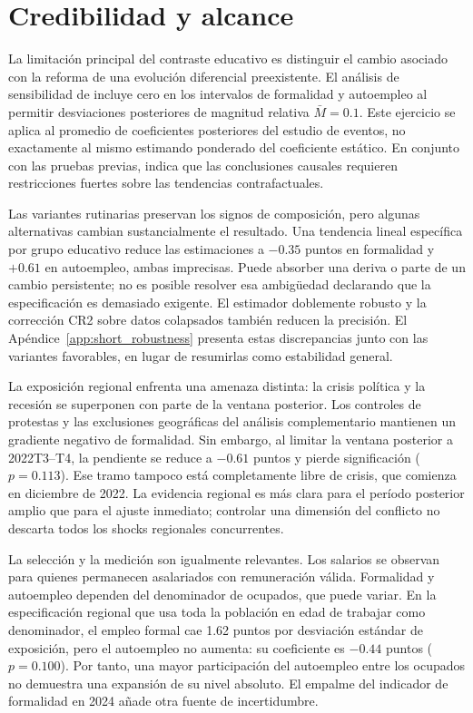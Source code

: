 \section{Credibilidad y alcance}

La limitación principal del contraste educativo es distinguir el cambio asociado con la reforma de una evolución diferencial preexistente. El análisis de sensibilidad de \citet{rambachan_roth_2023} incluye cero en los intervalos de formalidad y autoempleo al permitir desviaciones posteriores de magnitud relativa $\bar M=0.1$. Este ejercicio se aplica al promedio de coeficientes posteriores del estudio de eventos, no exactamente al mismo estimando ponderado del coeficiente estático. En conjunto con las pruebas previas, indica que las conclusiones causales requieren restricciones fuertes sobre las tendencias contrafactuales.

Las variantes rutinarias preservan los signos de composición, pero algunas alternativas cambian sustancialmente el resultado. Una tendencia lineal específica por grupo educativo reduce las estimaciones a $-0.35$ puntos en formalidad y $+0.61$ en autoempleo, ambas imprecisas. Puede absorber una deriva o parte de un cambio persistente; no es posible resolver esa ambigüedad declarando que la especificación es demasiado exigente. El estimador doblemente robusto y la corrección CR2 sobre datos colapsados también reducen la precisión. El Apéndice~\ref{app:short_robustness} presenta estas discrepancias junto con las variantes favorables, en lugar de resumirlas como estabilidad general.

La exposición regional enfrenta una amenaza distinta: la crisis política y la recesión se superponen con parte de la ventana posterior. Los controles de protestas y las exclusiones geográficas del análisis complementario mantienen un gradiente negativo de formalidad. Sin embargo, al limitar la ventana posterior a 2022T3--T4, la pendiente se reduce a $-0.61$ puntos y pierde significación ($p=0.113$). Ese tramo tampoco está completamente libre de crisis, que comienza en diciembre de 2022. La evidencia regional es más clara para el período posterior amplio que para el ajuste inmediato; controlar una dimensión del conflicto no descarta todos los shocks regionales concurrentes.

La selección y la medición son igualmente relevantes. Los salarios se observan para quienes permanecen asalariados con remuneración válida. Formalidad y autoempleo dependen del denominador de ocupados, que puede variar. En la especificación regional que usa toda la población en edad de trabajar como denominador, el empleo formal cae 1.62 puntos por desviación estándar de exposición, pero el autoempleo no aumenta: su coeficiente es $-0.44$ puntos ($p=0.100$). Por tanto, una mayor participación del autoempleo entre los ocupados no demuestra una expansión de su nivel absoluto. El empalme del indicador de formalidad en 2024 añade otra fuente de incertidumbre.

